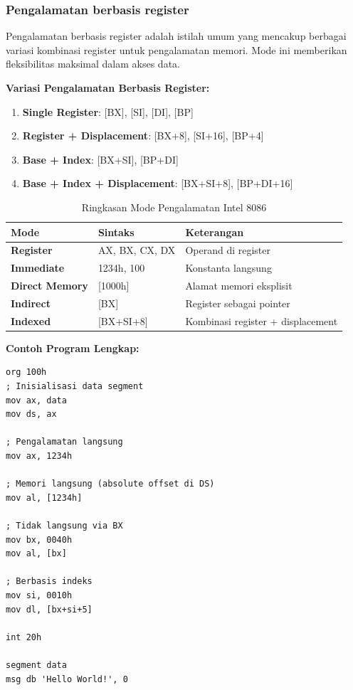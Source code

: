 \documentclass[../main.tex]{subfiles}
\begin{document}
\subsubsection{Pengalamatan berbasis register}
Pengalamatan berbasis register adalah istilah umum yang mencakup berbagai variasi kombinasi register untuk pengalamatan memori. Mode ini memberikan fleksibilitas maksimal dalam akses data.

\textbf{Variasi Pengalamatan Berbasis Register:}
\begin{enumerate}
    \item \textbf{Single Register}: [BX], [SI], [DI], [BP]
    \item \textbf{Register + Displacement}: [BX+8], [SI+16], [BP+4]
    \item \textbf{Base + Index}: [BX+SI], [BP+DI]
    \item \textbf{Base + Index + Displacement}: [BX+SI+8], [BP+DI+16]
\end{enumerate}

\begin{table}[h]
\centering
\caption{Ringkasan Mode Pengalamatan Intel 8086}
\begin{tabular}{|p{3cm}|p{4cm}|p{8cm}|}
\hline
\textbf{Mode} & \textbf{Sintaks} & \textbf{Keterangan} \\
\hline
\textbf{Register} & AX, BX, CX, DX & Operand di register \\
\hline
\textbf{Immediate} & 1234h, 100 & Konstanta langsung \\
\hline
\textbf{Direct Memory} & [1000h] & Alamat memori eksplisit \\
\hline
\textbf{Indirect} & [BX] & Register sebagai pointer \\
\hline
\textbf{Indexed} & [BX+SI+8] & Kombinasi register + displacement \\
\hline
\end{tabular}
\label{tab:addressing-modes-summary}
\end{table}

\textbf{Contoh Program Lengkap:}
\begin{lstlisting}[language={[x86masm]Assembler}, caption=Program Lengkap dengan Berbagai Mode Pengalamatan, label=lst:complete-program]
org 100h
; Inisialisasi data segment
mov ax, data
mov ds, ax

; Pengalamatan langsung
mov ax, 1234h

; Memori langsung (absolute offset di DS)
mov al, [1234h]

; Tidak langsung via BX
mov bx, 0040h
mov al, [bx]

; Berbasis indeks
mov si, 0010h
mov dl, [bx+si+5]

int 20h

segment data
msg db 'Hello World!', 0
\end{lstlisting}
\end{document}
